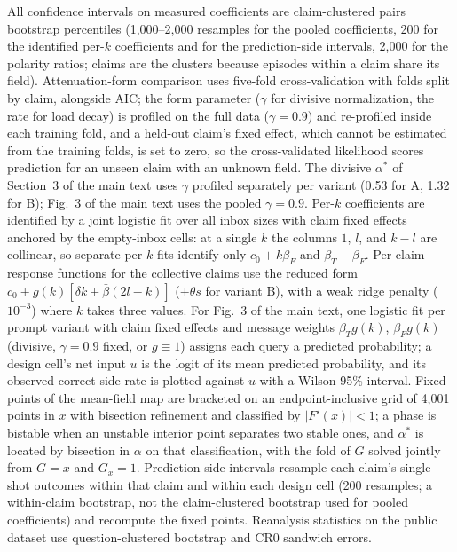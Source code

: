 \documentclass[11pt]{article}
\newcommand{\astar}{\alpha^{*}}
\begin{document}
All confidence intervals on measured coefficients are claim-clustered pairs
bootstrap percentiles (1{,}000--2{,}000 resamples for the pooled
coefficients, 200 for the identified per-$k$ coefficients and for the
prediction-side intervals, 2{,}000 for the polarity ratios; claims are the
clusters because episodes within a claim share its field). Attenuation-form comparison
uses five-fold cross-validation with folds split by claim, alongside AIC; the
form parameter ($\gamma$ for divisive normalization, the rate for load decay)
is profiled on the full data ($\gamma = 0.9$) and re-profiled inside each
training fold, and a held-out claim's fixed effect, which cannot be estimated
from the training folds, is set to zero, so the cross-validated likelihood
scores prediction for an unseen claim with an unknown field. The divisive
$\astar$ of Section~3 of the main text uses $\gamma$ profiled separately
per variant (0.53 for A, 1.32 for B); Fig.~3 of the main text uses the pooled
$\gamma = 0.9$. Per-$k$ coefficients are identified by a joint logistic fit
over all inbox sizes with claim fixed effects anchored by the empty-inbox
cells: at a single $k$ the columns $1$, $l$, and $k - l$ are collinear, so
separate per-$k$ fits identify only $c_0 + k\beta_F$ and $\beta_T - \beta_F$.
Per-claim response functions for the collective claims use the reduced form
$c_0 + g(k)[\delta k + \bar\beta(2l - k)]$ ($+\theta s$ for variant B), with
a weak ridge penalty ($10^{-3}$) where $k$ takes three values. For Fig.~3 of the main text, one logistic fit per prompt variant
with claim fixed effects and message weights $\beta_T g(k)$, $\beta_F g(k)$
(divisive, $\gamma = 0.9$ fixed, or $g \equiv 1$) assigns each query a
predicted probability; a design cell's net input $u$ is the logit of its mean
predicted probability, and its observed correct-side rate is plotted against
$u$ with a Wilson 95\% interval. Fixed points of the mean-field map are
bracketed on an endpoint-inclusive grid of 4{,}001 points in $x$ with
bisection refinement and classified by $|F'(x)| < 1$; a phase is bistable
when an unstable interior point separates two stable ones, and $\astar$ is
located by bisection in $\alpha$ on that classification, with the fold of $G$
solved jointly from $G = x$ and $G_x = 1$. Prediction-side intervals resample
each claim's single-shot outcomes within that claim and within each design
cell (200 resamples; a within-claim bootstrap, not the claim-clustered
bootstrap used for pooled coefficients) and recompute the fixed points. Reanalysis statistics on the public dataset use
question-clustered bootstrap and CR0 sandwich errors.
\end{document}
